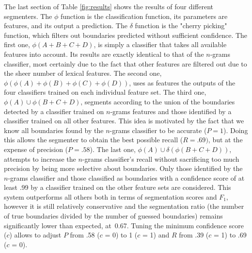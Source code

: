 The last section of Table \ref{fig:results} shows the results of four different segmenters.  The $\phi$ function is the classification function, its parameters are features, and its output a prediction. The $\delta$ function is the "cherry picking" function, which filters out boundaries predicted without sufficient confidence.  The first one, $\phi(A + B + C + D)$, is simply a classifier that takes all available features into account. Its results are exactly identical to that of the $n$-grams classifier, most certainly due to the fact that other features are filtered out due to the sheer number of lexical features. The second one, $\phi(\phi(A) + \phi(B) + \phi(C) + \phi(D))$, uses as features the outputs of the four classifiers trained on each individual feature set. The third one, $\phi(A) \cup \phi(B + C + D)$, segments according to the union of the boundaries detected by a classifier trained on $n$-grams features and those identified by a classifier trained on all other features. This idea is motivated by the fact that we know all boundaries found by the $n$-grams classifier to be accurate ($P=1$). Doing this allows the segmenter to obtain the best possible recall ($R=.69)$, but at the expense of precision ($P=.58$). The last one, $\phi(A) \cup \delta(\phi(B + C + D))$, attempts to increase the $n$-grams classifier's recall without sacrificing too much precision by being more selective about boundaries. Only those identified by the $n$-grams classifier and those classified as boundaries with a confidence score of at least .99 by a classifier trained on the other feature sets are considered. This system outperforms all others both in terms of segmentation scores and $F_1$, however it is still relatively conservative and the segmentation ratio (the number of true boundaries divided by the number of guessed boundaries) remains significantly lower than expected, at~0.67. Tuning the minimum confidence score ($c$) allows to adjust $P$ from .58 ($c$ = 0) to 1 ($c$ = 1) and $R$ from .39 ($c$ = 1) to .69 ($c$ = 0).